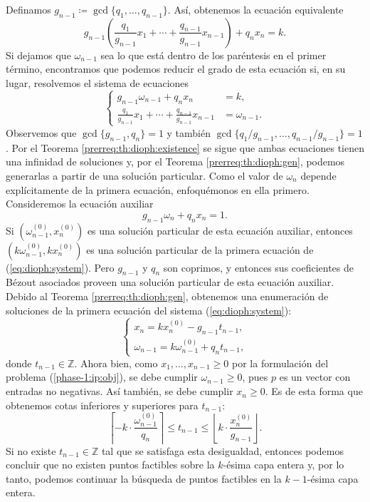 \documentclass[11pt]{article}
\begin{document}
Definamos $g_{n-1} \coloneq \gcd\lbrace q_1, \ldots, q_{n-1}\rbrace$. Así, obtenemos la
ecuación equivalente
\begin{equation*}
	g_{n-1} \left(
		\frac{q_1}{g_{n-1}}x_1 + \cdots + \frac{q_{n-1}}{g_{n-1}}x_{n-1}
		\right)
	+ q_nx_n = k.
\end{equation*}
Si dejamos que $\omega_{n-1}$ sea lo que está dentro de los paréntesis en el primer término, encontramos que
podemos reducir el grado de esta ecuación si, en su lugar, resolvemos el sistema de ecuaciones
\begin{equation}
	\label{eq:dioph:system}
	\begin{cases}
		g_{n-1}\omega_{n-1} + q_nx_n &= k, \\
		\frac{q_1}{g_{n-1}}x_1 + \cdots + \frac{q_{n-1}}{g_{n-1}}x_{n-1} &= \omega_{n-1}.
	\end{cases}
\end{equation}
Observemos que $\gcd\lbrace g_{n-1}, q_n \rbrace = 1$ y también $\gcd\lbrace q_1/g_{n-1}, \ldots,
q_{n-1}/g_{n-1}\rbrace = 1$. Por el Teorema \ref{prerreq:th:dioph:existence} se sigue que ambas
ecuaciones tienen una infinidad de soluciones y, por el Teorema \ref{prerreq:th:dioph:gen}, podemos
generarlas a partir de una solución particular. Como el valor de $\omega_n$ depende explícitamente
de la primera ecuación, enfoquémonos en ella primero. Consideremos la ecuación auxiliar
\begin{equation}
	\label{eq:dioph:orig:aux}
	g_{n-1}\omega_n + q_nx_n = 1.
\end{equation}
Si $(\omega_{n-1}^{(0)}, x_n^{(0)})$ es una solución particular de esta ecuación auxiliar, entonces
$(k\omega_{n-1}^{(0)}, kx_n^{(0)})$ es una solución particular de la primera ecuación de
(\ref{eq:dioph:system}). Pero $g_{n-1}$ y $q_n$ son coprimos, y entonces sus coeficientes de Bézout
asociados proveen una solución particular de esta ecuación auxiliar. Debido al Teorema
\ref{prerreq:th:dioph:gen}, obtenemos una enumeración de soluciones de la primera ecuación del sistema
(\ref{eq:dioph:system}):
\begin{equation*}
	\begin{cases}
		x_n = kx_n^{(0)} - g_{n-1}t_{n-1}, \\
		\omega_{n-1} = k\omega_{n-1}^{(0)} + q_nt_{n-1},
	\end{cases}
\end{equation*}
donde $t_{n-1} \in \mathbb{Z}$. Ahora bien, como $x_1, \ldots, x_{n - 1} \geq 0$ por la formulación
del problema (\ref{phase-1:ip:obj}), se debe cumplir $\omega_{n-1} \geq 0$, pues $p$ es un vector
con entradas no negativas. Así también, se debe cumplir $x_n \geq 0$. Es de esta forma que obtenemos
cotas inferiores y superiores para $t_{n-1}$:
\begin{equation}
	\label{eq:bounds}
	\left\lceil -k \cdot \frac{\omega_{n-1}^{(0)}}{q_n} \right\rceil
	\leq
	t_{n-1}
	\leq
	\left\lfloor k \cdot \frac{x_n^{(0)}}{g_{n-1}} \right\rfloor.
\end{equation}
Si no existe $t_{n-1} \in \mathbb{Z}$ tal que se satisfaga esta desigualdad, entonces podemos
concluir que no existen puntos factibles sobre la $k$-ésima capa entera y, por lo tanto, podemos
continuar la búsqueda de puntos factibles en la $k-1$-ésima capa entera.
\end{document}
